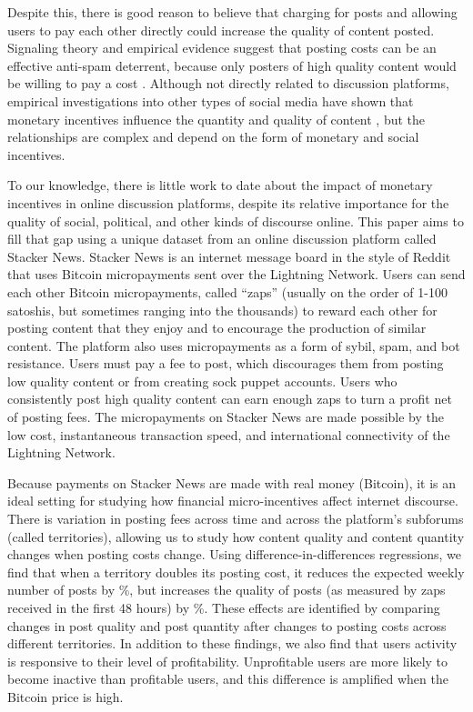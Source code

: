 Despite this, there is good reason to believe that charging for posts and allowing users to pay each other directly could increase the quality of content posted. Signaling theory and empirical evidence suggest that posting costs can be an effective anti-spam deterrent, because only posters of high quality content would be willing to pay a cost \citep{joseph2008email, tchernichovski2019pnas}. Although not directly related to discussion platforms, empirical investigations into other types of social media have shown that monetary incentives influence the quantity and quality of content \citep{chen2010google, sun2013blogs, burtch2017ms, elkomboz2023youtube, kerkhof2024youtube}, but the relationships are complex and depend on the form of monetary and social incentives.

To our knowledge, there is little work to date about the impact of monetary incentives in online discussion platforms, despite its relative importance for the quality of social, political, and other kinds of discourse online. This paper aims to fill that gap using a unique dataset from an online discussion platform called Stacker News. Stacker News is an internet message board in the style of Reddit that uses Bitcoin micropayments sent over the Lightning Network. Users can send each other Bitcoin micropayments, called ``zaps'' (usually on the order of 1-100 satoshis, but sometimes ranging into the thousands) to reward each other for posting content that they enjoy and to encourage the production of similar content. The platform also uses micropayments as a form of sybil, spam, and bot resistance. Users must pay a fee to post, which discourages them from posting low quality content or from creating sock puppet accounts. Users who consistently post high quality content can earn enough zaps to turn a profit net of posting fees. The micropayments on Stacker News are made possible by the low cost, instantaneous transaction speed, and international connectivity of the Lightning Network. 

Because payments on Stacker News are made with real money (Bitcoin), it is an ideal setting for studying how financial micro-incentives affect internet discourse. There is variation in posting fees across time and across the platform's subforums (called territories), allowing us to study how content quality and content quantity changes when posting costs change. Using difference-in-differences regressions, we find that when a territory doubles its posting cost, it reduces the expected weekly number of posts by \%, but increases the quality of posts (as measured by zaps received in the first 48 hours) by \%. These effects are identified by comparing changes in post quality and post quantity after changes to posting costs across different territories. In addition to these findings, we also find that users activity is responsive to their level of profitability. Unprofitable users are more likely to become inactive than profitable users, and this difference is amplified when the Bitcoin price is high. 

